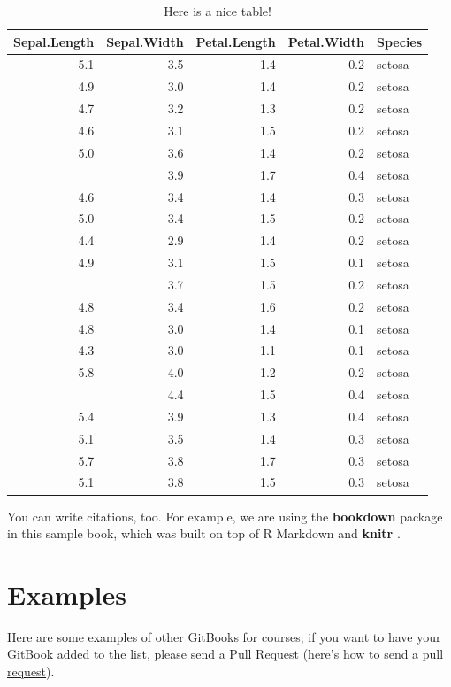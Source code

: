 \documentclass[
]{book}
\begin{document}
\begin{table}

\caption{\label{tab:nice-tab}Here is a nice table!}
\centering
\begin{tabular}[t]{rrrrl}
\toprule
Sepal.Length & Sepal.Width & Petal.Length & Petal.Width & Species\\
\midrule
5.1 & 3.5 & 1.4 & 0.2 & setosa\\
4.9 & 3.0 & 1.4 & 0.2 & setosa\\
4.7 & 3.2 & 1.3 & 0.2 & setosa\\
4.6 & 3.1 & 1.5 & 0.2 & setosa\\
5.0 & 3.6 & 1.4 & 0.2 & setosa\\
\addlinespace
5.4 & 3.9 & 1.7 & 0.4 & setosa\\
4.6 & 3.4 & 1.4 & 0.3 & setosa\\
5.0 & 3.4 & 1.5 & 0.2 & setosa\\
4.4 & 2.9 & 1.4 & 0.2 & setosa\\
4.9 & 3.1 & 1.5 & 0.1 & setosa\\
\addlinespace
5.4 & 3.7 & 1.5 & 0.2 & setosa\\
4.8 & 3.4 & 1.6 & 0.2 & setosa\\
4.8 & 3.0 & 1.4 & 0.1 & setosa\\
4.3 & 3.0 & 1.1 & 0.1 & setosa\\
5.8 & 4.0 & 1.2 & 0.2 & setosa\\
\addlinespace
5.7 & 4.4 & 1.5 & 0.4 & setosa\\
5.4 & 3.9 & 1.3 & 0.4 & setosa\\
5.1 & 3.5 & 1.4 & 0.3 & setosa\\
5.7 & 3.8 & 1.7 & 0.3 & setosa\\
5.1 & 3.8 & 1.5 & 0.3 & setosa\\
\bottomrule
\end{tabular}
\end{table}

You can write citations, too. For example, we are using the \textbf{bookdown} package \citep{R-bookdown} in this sample book, which was built on top of R Markdown and \textbf{knitr} \citep{xie2015}.

\hypertarget{examples}{%
\chapter{Examples}\label{examples}}

Here are some examples of other GitBooks for courses; if you want to have your GitBook added to the list, please send a \href{https://github.com/cjvanlissa/gitbook-demo/pulls}{Pull Request} (here's \href{https://help.github.com/en/github/collaborating-with-issues-and-pull-requests/creating-a-pull-request}{how to send a pull request}).
\end{document}
